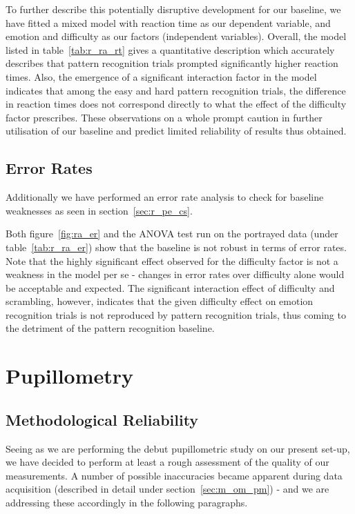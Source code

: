 	    To further describe this potentially disruptive development for our baseline, we have fitted a mixed model with reaction time as our dependent variable, and emotion and difficulty as our factors (independent variables).
	    Overall, the model listed in table~\ref{tab:r_ra_rt} gives a quantitative description which accurately describes that pattern recognition trials prompted significantly higher reaction times.
	    Also, the emergence of a significant interaction factor in the model indicates that among the easy and hard pattern recognition trials, the difference in reaction times does not correspond directly to what the effect of the difficulty factor prescribes.
	    These observations on a whole prompt caution in further utilisation of our baseline and predict limited reliability of results thus obtained.
	\subsection{Error Rates}\label{sec:r_ra_er}
	    Additionally we have performed an error rate analysis to check for baseline weaknesses as seen in section~\ref{sec:r_pe_cs}.
	    
	    Both figure~\ref{fig:ra_er} and the ANOVA test run on the portrayed data (under table~\ref{tab:r_ra_er}) show that the baseline is not robust in terms of error rates.
	    Note that the highly significant effect observed for the difficulty factor is not a weakness in the model per se - changes in error rates over difficulty alone would be acceptable and expected.
	    The significant interaction effect of difficulty and scrambling, however, indicates that the given difficulty effect on emotion recognition trials is not reproduced by pattern recognition trials, thus coming to the detriment of the pattern recognition baseline.	    
    
    \section{Pupillometry}\label{sec:r_p}
	\subsection{Methodological Reliability}\label{sec:r_p_mr}
	    Seeing as we are performing the debut pupillometric study on our present set-up, we have decided to perform at least a rough assessment of the quality of our measurements.
	    A number of possible inaccuracies became apparent during data acquisition (described in detail under section~\ref{sec:m_om_pm}) - 
	    and we are addressing these accordingly in the following paragraphs.
	    
